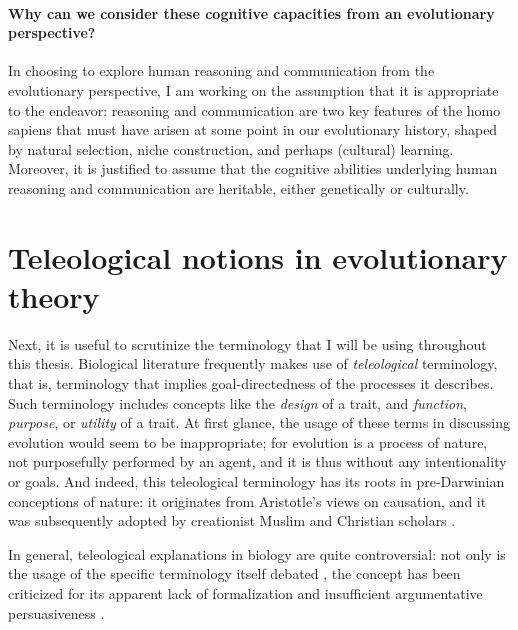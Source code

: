 \paragraph{Why can we consider these cognitive capacities from an evolutionary perspective?}

In choosing to explore human reasoning and communication from the evolutionary perspective, I am working on the assumption that it is appropriate to the endeavor: reasoning and communication are two key features of the homo sapiens that must have arisen at some point in our evolutionary history, shaped by natural selection, niche construction, and perhaps (cultural) learning. Moreover, it is justified to assume that the cognitive abilities underlying human reasoning and communication are heritable, either genetically or culturally.

\section{Teleological notions in evolutionary theory}
\label{sec:teleology}
Next, it is useful to scrutinize the terminology that I will be using throughout this thesis.
Biological literature frequently makes use of \emph{teleological} terminology, that is, terminology that implies goal-directedness of the processes it describes. Such terminology includes concepts like the \emph{design} of a trait, and \emph{function}, \emph{purpose}, or \emph{utility} of a trait.
At first glance, the usage of these terms in discussing evolution would seem to be inappropriate; for evolution is a process of nature, not purposefully performed by an agent, and it is thus without any intentionality or goals.
And indeed, this teleological terminology has its roots in pre-Darwinian conceptions of nature: it originates from Aristotle's views on causation, and it was subsequently adopted by creationist Muslim and Christian scholars \citep{Johnson05}.

In general, teleological explanations in biology are quite controversial: not only is the usage of the specific terminology itself debated \citep[p.~27 and references therein]{Ayala99}, the concept has been criticized for its apparent lack of formalization and insufficient argumentative persuasiveness \citep[p.~83]{Baedke2021}.

